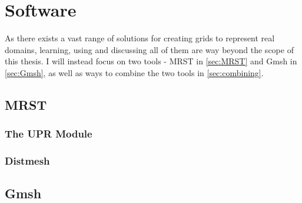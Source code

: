 \section{Software}
As there exists a vast range of solutions for creating grids to represent real domains, learning, using and discussing all of them are way beyond the scope of this thesis. I will instead focus on two tools - MRST in \autoref{sec:MRST} and Gmsh in \autoref{sec:Gmsh}, as well as ways to combine the two tools in \autoref{sec:combining}. 

\subsection{MRST}
\label{sec:MRST}


\subsubsection{The UPR Module}
\label{sec:UPR}

\subsubsection{Distmesh}


\subsection{Gmsh}
\label{sec:Gmsh}